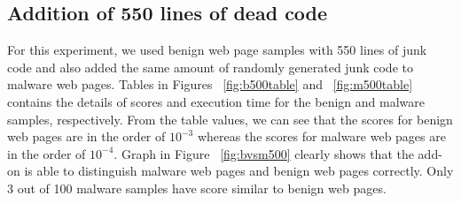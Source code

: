 \subsection{Addition of 550 lines of dead code}
For this experiment, we used benign web page samples with 550 lines of junk code and also added the same amount of randomly generated junk code to malware web pages. Tables in Figures ~\ref{fig:b500table} and  ~\ref{fig:m500table} contains the details of scores and execution time for the benign and malware samples, respectively. From the table values, we can see that the scores for benign web pages are in the order of $10^{-3}$ whereas the scores for malware web pages are in the order of $10^{-4}$. Graph in Figure ~\ref{fig:bvsm500} clearly shows that the add-on is able to distinguish malware web pages and benign web pages correctly. Only 3 out of 100 malware samples have score similar to benign web pages.

